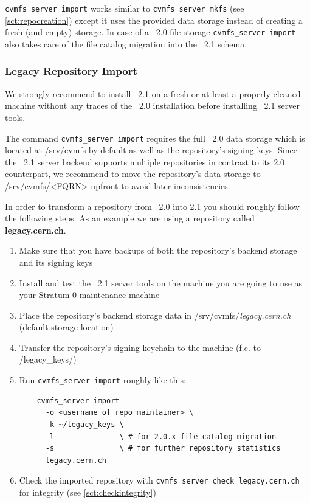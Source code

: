 \texttt{cvmfs\_server import} works similar to \texttt{cvmfs\_server mkfs} (see \ref{sct:repocreation}) except it uses the provided data storage instead of creating a fresh (and empty) storage.
In case of a \cvmfs\ 2.0 file storage \texttt{cvmfs\_server import} also takes care of the file catalog migration into the \cvmfs\ 2.1 schema.

\subsubsection{Legacy Repository Import}
We strongly recommend to install \cvmfs\ 2.1 on a fresh or at least a properly cleaned  machine without any traces of the \cvmfs\ 2.0 installation before installing \cvmfs\ 2.1 server tools.

The command \texttt{cvmfs\_server import} requires the full \cvmfs\ 2.0 data storage which is located at /srv/cvmfs by default as well as the repository's signing keys.
Since the \cvmfs\ 2.1 server backend supports multiple repositories in contrast to its 2.0 counterpart, we recommend to move the repository's data storage to /srv/cvmfs/<FQRN> upfront to avoid later inconsistencies.

\vspace*\baselineskip
In order to transform a repository from \cvmfs\ 2.0 into 2.1 you should roughly follow the following steps. As an example we are using a repository called \textbf{legacy.cern.ch}.
\begin{enumerate}
	\item Make sure that you have backups of both the repository's backend storage and its signing keys
	\item Install and test the \cvmfs\ 2.1 server tools on the machine you are going to use as your Stratum 0 maintenance machine
	\item Place the repository's backend storage data in /srv/cvmfs/\textit{legacy.cern.ch} \\ (default storage location)
	\item Transfer the repository's signing keychain to the machine (f.e. to \textapprox/legacy\_keys/)
	\item Run \texttt{cvmfs\_server import} roughly like this:
\begin{verbatim}
    cvmfs_server import
      -o <username of repo maintainer> \
      -k ~/legacy_keys \
      -l               \ # for 2.0.x file catalog migration
      -s               \ # for further repository statistics
      legacy.cern.ch
\end{verbatim}
    \item Check the imported repository with \texttt{cvmfs\_server check legacy.cern.ch} for integrity (see \ref{sct:checkintegrity})
\end{enumerate}


